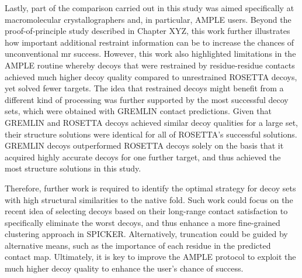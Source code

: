 Lastly, part of the comparison carried out in this study was aimed specifically at macromolecular crystallographers and, in particular, AMPLE users. Beyond the proof-of-principle study described in Chapter XYZ, this work further illustrates how important additional restraint information can be to increase the chances of unconventional \gls{mr} success. However, this work also highlighted limitations in the AMPLE routine whereby decoys that were restrained by residue-residue contacts achieved much higher decoy quality compared to unrestrained ROSETTA decoys, yet solved fewer targets. The idea that restrained decoys might benefit from a different kind of processing was further supported by the most successful decoy sets, which were obtained with GREMLIN contact predictions. Given that GREMLIN and ROSETTA decoys achieved similar decoy qualities for a large set, their structure solutions were identical for all of ROSETTA’s successful solutions. GREMLIN decoys outperformed ROSETTA decoys solely on the basis that it acquired highly accurate decoys for one further target, and thus achieved the most structure solutions in this study. 

Therefore, further work is required to identify the optimal strategy for decoy sets with high structural similarities to the native fold. Such work could focus on the recent idea of selecting decoys based on their long-range contact satisfaction \cite{De_Oliveira2017-yf, Ovchinnikov2017-nd} to specifically eliminate the worst decoys, and thus enhance a more fine-grained clustering approach in SPICKER. Alternatively, truncation could be guided by alternative means, such as the importance of each residue in the predicted contact map. Ultimately, it is key to improve the AMPLE protocol to exploit the much higher decoy quality to enhance the user’s chance of success.
